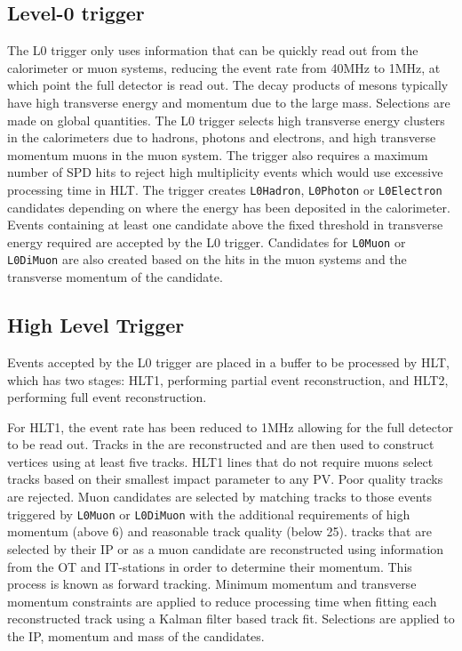 \subsection{Level-0 trigger}

The L0 trigger only uses information that can be quickly read out from the calorimeter or muon systems, reducing the event rate from 40MHz to 1MHz, at which point the full detector is read out. The decay products of \B mesons typically have high transverse energy and momentum due to the large \B mass. Selections are made on global quantities. The L0 trigger selects high transverse energy clusters in the calorimeters due to hadrons, photons and electrons, and high transverse momentum muons in the muon system. The trigger also requires a maximum number of SPD hits to reject high multiplicity events which would use excessive processing time in HLT. The trigger creates {\tt L0Hadron}, {\tt L0Photon} or {\tt L0Electron} candidates depending on where the energy has been deposited in the calorimeter. Events containing at least one candidate above the fixed threshold in transverse energy required are accepted by the L0 trigger. Candidates for {\tt L0Muon} or {\tt L0DiMuon} are also created based on the hits in the muon systems and the transverse momentum of the candidate.

\subsection{High Level Trigger}

Events accepted by the L0 trigger are placed in a buffer to be processed by HLT, which has two stages: HLT1, performing partial event reconstruction, and HLT2, performing full event reconstruction. 

For HLT1, the event rate has been reduced to 1MHz allowing for the full detector to be read out. Tracks in the \velo are reconstructed and are then used to construct vertices using at least five tracks. HLT1 lines that do not require muons select \velo tracks based on their smallest impact parameter to any PV. Poor quality \velo tracks are rejected. Muon candidates are selected by matching \velo tracks to those events triggered by {\tt L0Muon} or {\tt L0DiMuon} with the additional requirements of high momentum (above 6\gevc) and reasonable track quality (\chisqndf below 25). \velo tracks that are selected by their IP or as a muon candidate are reconstructed using information from the OT and IT-stations in order to determine their momentum. This process is known as forward tracking. Minimum momentum and transverse momentum constraints are applied to reduce processing time when fitting each reconstructed track using a Kalman filter based track fit. Selections are applied to the IP, momentum and mass of the candidates.

